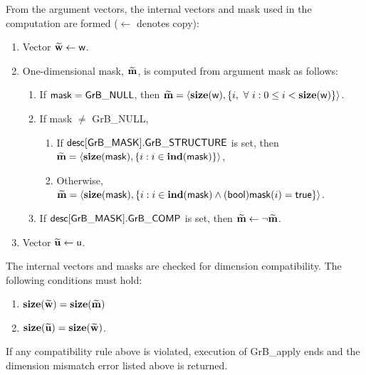 From the argument vectors, the internal vectors and mask used in 
the computation are formed ($\leftarrow$ denotes copy):
\begin{enumerate}
    \item Vector ${\bf \widetilde{w}} \leftarrow {\sf w}$.

    \item One-dimensional mask, ${\bf \widetilde{m}}$, is computed from 
    argument {\sf mask} as follows:
    \begin{enumerate}
        \item If ${\sf mask} = {\sf GrB\_NULL}$, then ${\bf \widetilde{m}} = 
        \langle \bold{size}({\sf w}), \{i, \ \forall \ i : 0 \leq i < 
        \bold{size}({\sf w}) \} \rangle$.

        \item If {\sf mask} $\ne$ {\sf GrB\_NULL},  
        \begin{enumerate}
            \item If ${\sf desc[GrB\_MASK].GrB\_STRUCTURE}$ is set, then
            ${\bf \widetilde{m}} = 
            \langle \bold{size}({\sf mask}), \{i : i \in \bold{ind}({\sf mask}) \} \rangle$,
            \item Otherwise, ${\bf \widetilde{m}} = 
            \langle \bold{size}({\sf mask}), \{i : i \in \bold{ind}({\sf mask}) \wedge
            ({\sf bool}){\sf mask}(i) = {\sf true} \} \rangle$.
        \end{enumerate}

        \item    If ${\sf desc[GrB\_MASK].GrB\_COMP}$ is set, then 
        ${\bf \widetilde{m}} \leftarrow \neg {\bf \widetilde{m}}$.
    \end{enumerate}

    \item Vector ${\bf \widetilde{u}} \leftarrow {\sf u}$.
\end{enumerate}

The internal vectors and masks are checked for dimension compatibility. 
The following conditions must hold:
\begin{enumerate}
    \item $\bold{size}({\bf \widetilde{w}}) = \bold{size}({\bf \widetilde{m}})$
    \item $\bold{size}({\bf \widetilde{u}}) = \bold{size}({\bf \widetilde{w}})$.
\end{enumerate}
If any compatibility rule above is violated, execution of {\sf GrB\_apply} ends and 
the dimension mismatch error listed above is returned.

